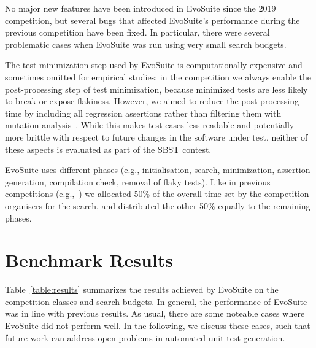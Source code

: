 \documentclass[sigconf]{acmart}
\newcommand{\EVOSUITE}{{\sc EvoSuite}\xspace}
\begin{document}
No major new features have been introduced in \EVOSUITE since the 2019 competition, but several bugs that affected \EVOSUITE's performance during the previous competition have been fixed. In particular, there were several problematic cases when \EVOSUITE was run using very small search budgets.

The test minimization step used by \EVOSUITE is computationally expensive and
sometimes omitted for empirical studies; in the competition we always enable
the post-processing step of test minimization, because minimized tests are less
likely to break or expose flakiness. However, we aimed to reduce the
post-processing time by including all regression assertions rather than
filtering them with mutation analysis~\cite{10.1109/TSE.2011.93}. While this
makes test cases less readable and potentially more brittle with respect to
future changes in the software under test, neither of these aspects is
evaluated as part of the SBST contest.

\EVOSUITE uses different phases (e.g., initialisation, search, minimization,
assertion generation, compilation check, removal of flaky tests). Like in
previous competitions (e.g.,~\cite{evosuiteAtSbst2016}) we allocated 50\% of
the overall time set by the competition organisers for the search, and
distributed the other 50\% equally to the remaining phases.



\section{Benchmark Results}


\begin{table*}[t!]
  \centering
  \caption{\label{table:results}Detailed results of \EVOSUITE on the
    SBST benchmark classes.}
\resizebox{0.9\textwidth}{!}{  

}	
\end{table*}

Table~\ref{table:results} summarizes the results achieved by \EVOSUITE on the competition classes and search budgets. In general, the performance of \EVOSUITE was in line with previous
results. As usual, there are some noteable cases where \EVOSUITE did not perform well. In the following, we discuss these cases, such that future work can address open problems in automated unit test generation.


\end{document}
